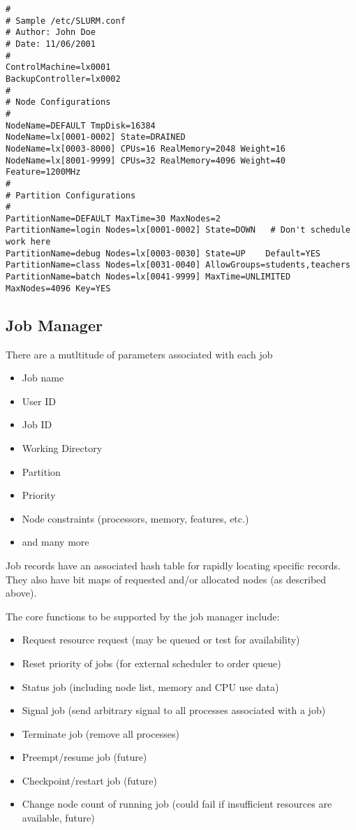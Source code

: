 \begin{verbatim}
# 
# Sample /etc/SLURM.conf
# Author: John Doe
# Date: 11/06/2001
#
ControlMachine=lx0001
BackupController=lx0002
#
# Node Configurations
#
NodeName=DEFAULT TmpDisk=16384
NodeName=lx[0001-0002] State=DRAINED
NodeName=lx[0003-8000] CPUs=16 RealMemory=2048 Weight=16
NodeName=lx[8001-9999] CPUs=32 RealMemory=4096 Weight=40 Feature=1200MHz
#
# Partition Configurations
#
PartitionName=DEFAULT MaxTime=30 MaxNodes=2
PartitionName=login Nodes=lx[0001-0002] State=DOWN   # Don't schedule work here
PartitionName=debug Nodes=lx[0003-0030] State=UP    Default=YES
PartitionName=class Nodes=lx[0031-0040] AllowGroups=students,teachers
PartitionName=batch Nodes=lx[0041-9999] MaxTime=UNLIMITED MaxNodes=4096 Key=YES
\end{verbatim}

\subsection{Job Manager}

There are a mutltitude of parameters associated with each job
\begin{itemize}
\item Job name
\item User ID
\item Job ID
\item Working Directory
\item Partition
\item Priority
\item Node constraints (processors, memory, features, etc.)
\item and many more
\end{itemize}

Job records have an associated hash table for rapidly locating 
specific records. They also have bit maps of requested and/or 
allocated nodes (as described above).

The core functions to be supported by the job manager include:
\begin{itemize}
\item Request resource request (may be queued or test for availability)
\item Reset priority of jobs (for external scheduler to order queue)
\item Status job (including node list, memory and CPU use data)
\item Signal job (send arbitrary signal to all processes associated with a job)
\item Terminate job (remove all processes)
\item Preempt/resume job  (future)
\item Checkpoint/restart job (future)
\item Change node count of running job (could fail if insufficient resources are 
available, future)
\end{itemize}

